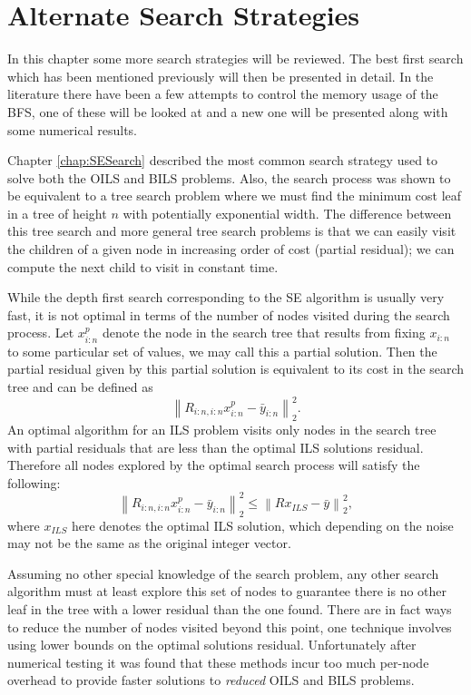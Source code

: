 \documentclass[12pt,Bold,letterpaper]{mcgilletdclass}
\begin{document}
\chapter{Alternate Search Strategies} \label{chap:Searches}

In this chapter some more search strategies will be reviewed. The best first search which has been mentioned previously will then be presented in detail. In the literature there have been a few attempts to control the memory usage of the BFS, one of these will be looked at and a new one will be presented along with some numerical results.

Chapter \ref{chap:SESearch} described the most common search strategy used to solve both the OILS and BILS problems. Also, the search process was shown to be equivalent to a tree search problem where we must find the minimum cost leaf in a tree of height $n$ with potentially exponential width. The difference between this tree search and more general tree search problems is that we can easily visit the children of a given node in increasing order of cost (partial residual); we can compute the next child to visit in constant time. 

While the depth first search corresponding to the SE algorithm is usually very fast, it is not optimal in terms of the number of nodes visited during the search process. Let $x_{i:n}^p$ denote the node in the search tree that results from fixing $x_{i:n}$ to some particular set of values, we may call this a partial solution. Then the partial residual given by this partial solution is equivalent to its cost in the search tree and can be defined as $$\left \| R_{i:n,i:n}x_{i:n}^p - \bar{y}_{i:n}\right \|_2^2.$$ An optimal algorithm for an ILS problem visits only nodes in the search tree with partial residuals that are less than the optimal ILS solutions residual. Therefore all nodes explored by the optimal search process will satisfy the following:
\begin{equation}\label{eq:optimalSearchCond}
\left \| R_{i:n,i:n}x_{i:n}^p - \bar{y}_{i:n}\right \|_2^2 \le \left \| Rx_{ILS} - \bar{y} \right \|_2^2,
\end{equation}
where $x_{ILS}$ here denotes the optimal ILS solution, which depending on the noise may not be the same as the original integer vector.

Assuming no other special knowledge of the search problem, any other search algorithm must at least explore this set of nodes to guarantee there is no other leaf in the tree with a lower residual than the one found. There are in fact ways to reduce the number of nodes visited beyond this point, one technique involves using lower bounds on the optimal solutions residual. Unfortunately after numerical testing it was found that these methods incur too much per-node overhead to provide faster solutions to {\em reduced} OILS and BILS problems.
\end{document}
